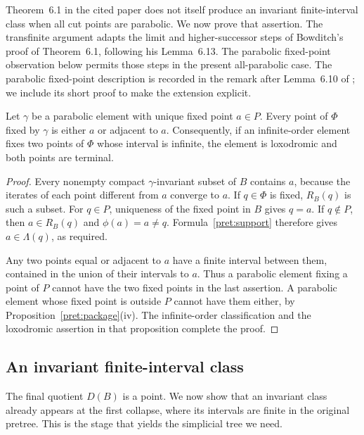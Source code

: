 Theorem~6.1 in the cited paper does not itself produce an invariant
finite-interval class when all cut points are parabolic.  We now prove
that assertion. The transfinite argument adapts the limit and
higher-successor steps of Bowditch's proof of Theorem~6.1, following
his Lemma~6.13. The parabolic fixed-point observation below permits
those steps in the present all-parabolic case.
The parabolic fixed-point description is recorded in
the remark after Lemma~6.10 of \cite{Bowditch1999Treelike}; we include
its short proof to make the extension explicit.

\begin{lemma}\label{pret:parabolic-star}
Let $\gamma$ be a parabolic element with unique fixed point $a\in P$.
Every point of $\Phi$ fixed by $\gamma$ is either $a$ or adjacent to $a$.
Consequently, if an infinite-order element fixes two points of $\Phi$
whose interval is infinite, the element is loxodromic and both points
are terminal.
\end{lemma}

\begin{proof}
Every nonempty compact $\gamma$-invariant subset of $B$ contains $a$,
because the iterates of each point different from $a$ converge to $a$.
If $q\in\Phi$ is fixed, $R_B(q)$ is such a subset.  For $q\in P$,
uniqueness of the fixed point in $B$ gives $q=a$.  If $q\notin P$,
then $a\in R_B(q)$ and $\phi(a)=a\ne q$.  Formula~\eqref{pret:support}
therefore gives $a\in\Lambda(q)$, as required.

Any two points equal or adjacent to $a$ have a finite interval between
them, contained in the union of their intervals to $a$.  Thus a parabolic
element fixing a point of $P$ cannot have the two fixed points in the
last assertion.  A parabolic element whose fixed point is outside $P$
cannot have them either, by Proposition~\ref{pret:package}\textup{(iv)}.
The infinite-order classification and the loxodromic assertion in that
proposition complete the proof.
\end{proof}

\subsection{An invariant finite-interval class}

The final quotient $D(B)$ is a point. We now show that an invariant
class already appears at the first collapse, where its intervals are
finite in the original pretree. This is the stage that yields the
simplicial tree we need.


